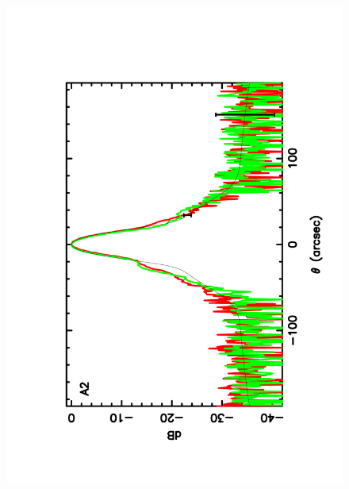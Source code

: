 \begin{figure}[h]
\begin{center}
\includegraphics[clip, angle=-90, scale = 0.3]{Figures/Array_A2_dB.pdf}

\end{center}
\end{figure}
